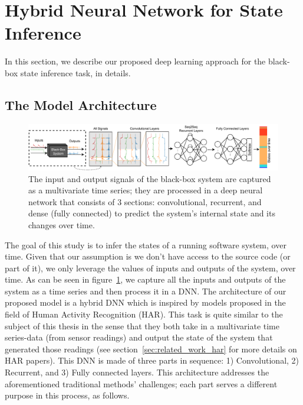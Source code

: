 \section{Hybrid Neural Network for State Inference} \label{sec:approach}
In this section, we describe our proposed deep learning approach for the black-box state inference task, in details. 

\subsection{The Model Architecture}
\begin{figure}
    \centering
    \includegraphics[width=\textwidth]{ASE_files/GeneralConvolutionalNet.pdf}
    \caption{The input and output signals of the black-box system are captured as a multivariate time series; they are processed in a deep neural network that consists of 3 sections: convolutional, recurrent, and dense (fully connected) to predict the system's internal state and its changes over time.}
    \label{fig:general_net}
\end{figure}

The goal of this study is to infer the states of a running software system, over time. Given that our assumption is we don't have access to the source code (or part of it), we only leverage the values of inputs and outputs of the system, over time. As can be seen in figure~\ref{fig:general_net}, we capture all the inputs and outputs of the system as a time series and then process it in a DNN. The architecture of our proposed model is a hybrid DNN which is inspired by models proposed in the field of Human Activity Recognition (HAR). This task is quite similar to the subject of this thesis in the sense that they both take in a multivariate time series-data (from sensor readings) and output the state of the system that generated those readings (see section~\ref{sec:related_work_har} for more details on HAR papers). This DNN is made of three parts in sequence: 1) Convolutional, 2) Recurrent, and 3) Fully connected layers. This architecture addresses the aforementioned traditional methods' challenges; each part serves a different purpose in this process, as follows.



